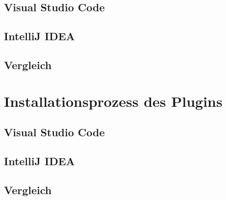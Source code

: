 \subsection{Visual Studio Code}

\subsection{IntelliJ IDEA}

\subsection{Vergleich}


\section{Installationsprozess des Plugins}
\label{sec:Vergleich_Installationsprozess}

\subsection{Visual Studio Code}

\subsection{IntelliJ IDEA}

\subsection{Vergleich}
